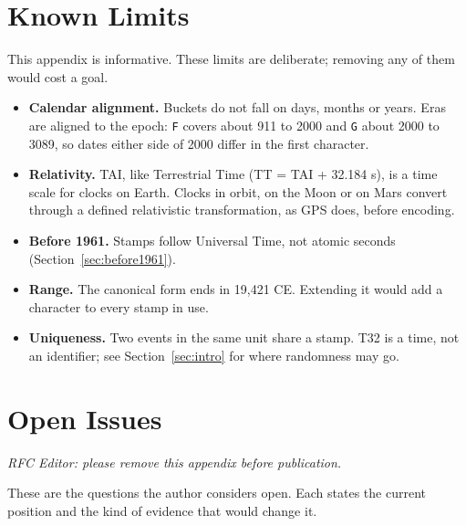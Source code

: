 \documentclass[11pt]{article}
\newcommand{\lit}[1]{\texttt{#1}}
\newcommand{\Sec}[1]{Section~\ref{#1}}
\begin{document}
\section{Known Limits}\label{app:limits}

This appendix is informative. These limits are deliberate; removing any of
them would cost a goal.

\begin{itemize}
\item \textbf{Calendar alignment.} Buckets do not fall on days, months or
years. Eras are aligned to the epoch: \lit{F} covers about 911 to 2000 and
\lit{G} about 2000 to 3089, so dates either side of 2000 differ in the first
character.
\item \textbf{Relativity.} TAI, like Terrestrial Time (TT = TAI + 32.184 s),
is a time scale for clocks on Earth. Clocks in orbit, on the Moon or on Mars
convert through a defined relativistic transformation, as GPS does, before
encoding.
\item \textbf{Before 1961.} Stamps follow Universal Time, not atomic seconds
(\Sec{sec:before1961}).
\item \textbf{Range.} The canonical form ends in 19,421 CE. Extending it would
add a character to every stamp in use.
\item \textbf{Uniqueness.} Two events in the same unit share a stamp. T32 is a
time, not an identifier; see \Sec{sec:intro} for where randomness may go.
\end{itemize}

\section{Open Issues}\label{app:open}

\emph{RFC Editor: please remove this appendix before publication.}

These are the questions the author considers open. Each states the current
position and the kind of evidence that would change it.
\end{document}
